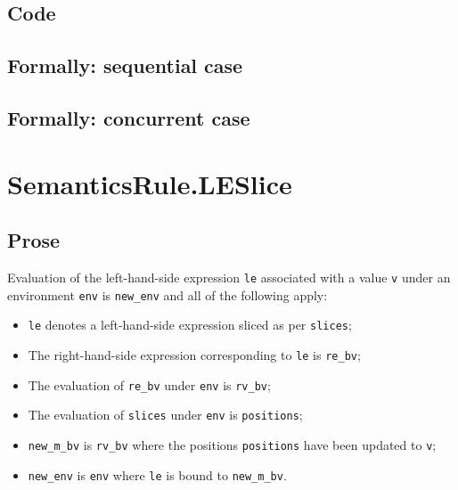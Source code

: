 \documentclass{book}
\begin{document}
  \subsection{Code}

\begin{emptyformal}
  \subsection{Formally: sequential case}

  \subsection{Formally: concurrent case}
\end{emptyformal}


\section{SemanticsRule.LESlice \label{sec:SemanticsRule.LESlice}}

    \subsection{Prose}
    Evaluation of the left-hand-side expression \texttt{le} associated with a
value \texttt{v} under an environment \texttt{env} is \texttt{new\_env} and all
of the following apply:
    \begin{itemize}
    \item \texttt{le} denotes a left-hand-side expression sliced as per \texttt{slices};
    \item The right-hand-side expression corresponding to \texttt{le} is \texttt{re\_bv};
    \item The evaluation of \texttt{re\_bv} under \texttt{env} is \texttt{rv\_bv};
    \item The evaluation of \texttt{slices} under \texttt{env} is \texttt{positions};
    \item \texttt{new\_m\_bv} is \texttt{rv\_bv} where the positions \texttt{positions} have been updated to \texttt{v};
    \item \texttt{new\_env} is \texttt{env} where \texttt{le} is bound to \texttt{new\_m\_bv}.
    \end{itemize}
\end{document}
